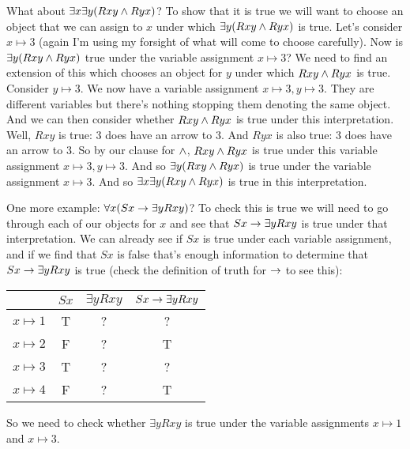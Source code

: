 What about $\exists x \exists y(Rxy \mathbin{\wedge} Ryx)$? To show that it is true we will want to choose an object that we can assign to $x$ under which $\exists y (Rxy\mathbin{\wedge} Ryx)$ is true. Let's consider $x\mapsto 3$ (again I'm using my forsight of what will come to choose carefully). Now is $\exists y (Rxy\mathbin{\wedge} Ryx)$  true under the variable assignment $x\mapsto 3$? We need to find an extension of this which chooses an object for $y$ under which $Rxy\mathbin{\wedge} Ryx$ is true. Consider $y\mapsto 3$. We now have a variable assignment $x\mapsto 3, y\mapsto 3$. They are different variables but there's nothing stopping them denoting the same object. And we can then consider whether $Rxy\mathbin{\wedge} Ryx$ is true under this interpretation. Well, $Rxy$ is true: 3 does have an arrow to 3. And $Ryx$ is also true: 3 does have an arrow to 3. So by our clause for $\mathbin{\wedge}$, $Rxy\mathbin{\wedge} Ryx$ is true under this variable assignment $x\mapsto 3, y\mapsto 3$. And so $\exists y(Rxy\mathbin{\wedge} Ryx)$ is true under the variable assignment $x\mapsto 3$. And so $\exists x\exists y(Rxy\mathbin{\wedge} Ryx)$ is true in this interpretation.

One more example: $\forall x(Sx\rightarrow \exists y Rxy)$? To check this is true we will need to go through each of our objects for $x$ and see that $Sx\rightarrow \exists y Rxy$ is true under that interpretation. We can already see if $Sx$ is true under each variable assignment, and if we find that $Sx$ is false that's enough information to determine that $Sx\rightarrow \exists y Rxy$ is true (check the definition of truth for $\rightarrow$ to see this):
\begin{center}
\begin{tabular}{c|ccc}
&$Sx$&$\exists y Rxy$&$Sx\rightarrow\exists y Rxy$\Bstrut\\\hline\Tstrut
$x\mapsto 1$&T&?&?\\
$x\mapsto 2$&F&?&T\\
$x\mapsto 3$&T&?&?\\
$x\mapsto 4$&F&?&T
\end{tabular}
\end{center}

So we need to check  whether $\exists y Rxy$ is true under the variable assignments $x\mapsto 1$ and $x\mapsto 3$.

